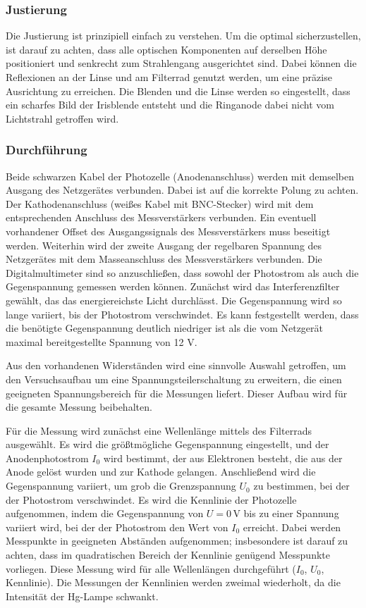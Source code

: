 \documentclass{article}
\begin{document}
\subsubsection*{Justierung}
Die Justierung ist prinzipiell einfach zu verstehen. Um die optimal sicherzustellen, ist darauf zu achten, dass alle optischen 
Komponenten auf derselben Höhe positioniert und senkrecht zum Strahlengang ausgerichtet 
sind. Dabei können die Reflexionen an der Linse und am Filterrad genutzt werden, um eine 
präzise Ausrichtung zu erreichen. Die Blenden und die Linse werden so eingestellt, dass ein 
scharfes Bild der Irisblende entsteht und die Ringanode dabei nicht vom Lichtstrahl getroffen 
wird.

\subsubsection*{Durchführung}
Beide schwarzen Kabel der Photozelle (Anodenanschluss) werden mit demselben Ausgang des 
Netzgerätes verbunden. Dabei ist auf die korrekte Polung zu achten. Der Kathodenanschluss 
(weißes Kabel mit BNC-Stecker) wird mit dem entsprechenden Anschluss des Messverstärkers 
verbunden. Ein eventuell vorhandener Offset des Ausgangssignals des Messverstärkers muss 
beseitigt werden. Weiterhin wird der zweite Ausgang der regelbaren Spannung des Netzgerätes 
mit dem Masseanschluss des Messverstärkers verbunden. Die Digitalmultimeter sind so 
anzuschließen, dass sowohl der Photostrom als auch die Gegenspannung gemessen werden können.
Zunächst wird das Interferenzfilter gewählt, das das energiereichste Licht durchlässt. 
Die Gegenspannung wird so lange variiert, bis der Photostrom verschwindet. Es kann festgestellt 
werden, dass die benötigte Gegenspannung deutlich niedriger ist als die vom Netzgerät maximal 
bereitgestellte Spannung von 12 V.

Aus den vorhandenen Widerständen wird eine sinnvolle Auswahl getroffen, um den Versuchsaufbau
 um eine Spannungsteilerschaltung zu erweitern, die einen geeigneten Spannungsbereich für die
  Messungen liefert. Dieser Aufbau wird für die gesamte Messung beibehalten.

Für die Messung wird zunächst eine Wellenlänge mittels des Filterrads ausgewählt. 
Es wird die größtmögliche Gegenspannung eingestellt, und der Anodenphotostrom $I_0$ 
wird bestimmt, der aus Elektronen besteht, die aus der Anode gelöst wurden und zur 
Kathode gelangen. Anschließend wird die Gegenspannung variiert, um grob die Grenzspannung
 $U_0$ zu bestimmen, bei der der Photostrom verschwindet. Es wird die Kennlinie der 
 Photozelle aufgenommen, indem die Gegenspannung von $U = 0\,\mathrm{V}$ bis zu einer 
 Spannung variiert wird, bei der der Photostrom den Wert von $I_0$ erreicht. Dabei 
 werden Messpunkte in geeigneten Abständen aufgenommen; insbesondere ist darauf zu achten, 
 dass im quadratischen Bereich der Kennlinie genügend Messpunkte vorliegen.
Diese Messung wird für alle Wellenlängen durchgeführt ($I_0$, $U_0$, Kennlinie). 
Die Messungen der Kennlinien werden zweimal wiederholt, da die Intensität der Hg-Lampe schwankt.
\end{document}
